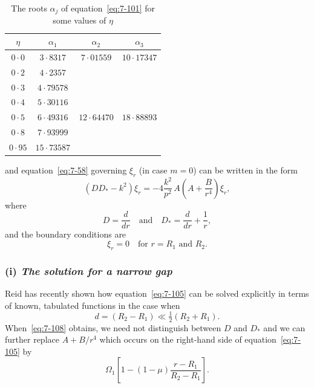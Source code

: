 \begin{table}[htbp]
\centering
\caption{The roots $\alpha_j$ of equation~\eqref{eq:7-101} for some values of $\eta$}
\label{tab:XXXI}
\begin{tabular}{cccc}
\hline
$\eta$ & $\alpha_1$ & $\alpha_2$ & $\alpha_3$ \\
\hline
$0{\cdot}0$ & $3{\cdot}8317$ & $7{\cdot}01559$ & $10{\cdot}17347$ \\
$0{\cdot}2$ & $4{\cdot}2357$ & & \\
$0{\cdot}3$ & $4{\cdot}79578$ & & \\
$0{\cdot}4$ & $5{\cdot}30116$ & & \\
$0{\cdot}5$ & $6{\cdot}49316$ & $12{\cdot}64470$ & $18{\cdot}88893$ \\
$0{\cdot}8$ & $7{\cdot}93999$ & & \\
$0{\cdot}95$ & $15{\cdot}73587$ & & \\
\hline
\end{tabular}
\end{table}

and equation~\eqref{eq:7-58} governing $\xi_r$ (in case $m = 0$) can be written in the form
\begin{equation}
\label{eq:7-105}
(DD_* - k^2)\xi_r = -4\frac{k^2}{p^2}\,A\!\left(A+\frac{B}{r^4}\right)\xi_r,
\end{equation}
where
\begin{equation}
\label{eq:7-106}
D = \frac{d}{dr} \quad \text{and} \quad
D_* = \frac{d}{dr}+\frac{1}{r},
\end{equation}
and the boundary conditions are
\begin{equation}
\label{eq:7-107}
\xi_r = 0 \quad \text{for } r = R_1 \text{ and } R_2.
\end{equation}

\subsubsection*{(i) \emph{The solution for a narrow gap}}
Reid has recently shown how equation~\eqref{eq:7-105} can be solved explicitly
in terms of known, tabulated functions in the case when
\begin{equation}
\label{eq:7-108}
d = (R_2-R_1) \ll \tfrac{1}{2}(R_2+R_1).
\end{equation}
When~\eqref{eq:7-108} obtains, we need not distinguish between $D$ and $D_*$ and we
can further replace $A+B/r^4$ which occurs on the right-hand side of
equation~\eqref{eq:7-105} by
\begin{equation}
\label{eq:7-109}
\Omega_1\!\left[1-(1-\mu)\frac{r-R_1}{R_2-R_1}\right].
\end{equation}

